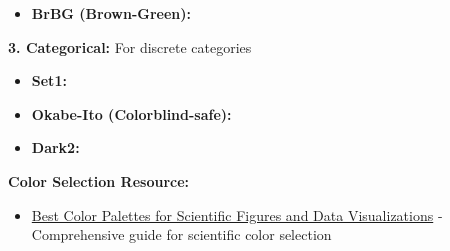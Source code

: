 \documentclass[11pt,a4paper]{article}
\begin{document}
\begin{tcolorbox}[colback=blue!5,colframe=blue!50,title=Professional Color Palettes]
\begin{itemize}
    \item \textbf{BrBG (Brown-Green):} 
    \colorbox[HTML]{543005}{\phantom{XX}}
    \colorbox[HTML]{8c510a}{\phantom{XX}}
    \colorbox[HTML]{bf812d}{\phantom{XX}}
    \colorbox[HTML]{dfc27d}{\phantom{XX}}
    \colorbox[HTML]{f6e8c3}{\phantom{XX}}
    \colorbox[HTML]{c7eae5}{\phantom{XX}}
    \colorbox[HTML]{80cdc1}{\phantom{XX}}
    \colorbox[HTML]{35978f}{\phantom{XX}}
    \colorbox[HTML]{01665e}{\phantom{XX}}
    \colorbox[HTML]{003c30}{\phantom{XX}}
\end{itemize}

\textbf{3. Categorical:} For discrete categories

\begin{itemize}
    \item \textbf{Set1:} 
    \colorbox[HTML]{e41a1c}{\phantom{XX}}
    \colorbox[HTML]{377eb8}{\phantom{XX}}
    \colorbox[HTML]{4daf4a}{\phantom{XX}}
    \colorbox[HTML]{984ea3}{\phantom{XX}}
    \colorbox[HTML]{ff7f00}{\phantom{XX}}
    \colorbox[HTML]{ffff33}{\phantom{XX}}
    \colorbox[HTML]{a65628}{\phantom{XX}}
    \colorbox[HTML]{f781bf}{\phantom{XX}}
    \colorbox[HTML]{999999}{\phantom{XX}}
    
    \item \textbf{Okabe-Ito (Colorblind-safe):} 
    \colorbox[HTML]{E69F00}{\phantom{XX}}
    \colorbox[HTML]{56B4E9}{\phantom{XX}}
    \colorbox[HTML]{009E73}{\phantom{XX}}
    \colorbox[HTML]{F0E442}{\phantom{XX}}
    \colorbox[HTML]{0072B2}{\phantom{XX}}
    \colorbox[HTML]{D55E00}{\phantom{XX}}
    \colorbox[HTML]{CC79A7}{\phantom{XX}}
    \colorbox[HTML]{000000}{\phantom{XX}}
    
    \item \textbf{Dark2:} 
    \colorbox[HTML]{1b9e77}{\phantom{XX}}
    \colorbox[HTML]{d95f02}{\phantom{XX}}
    \colorbox[HTML]{7570b3}{\phantom{XX}}
    \colorbox[HTML]{e7298a}{\phantom{XX}}
    \colorbox[HTML]{66a61e}{\phantom{XX}}
    \colorbox[HTML]{e6ab02}{\phantom{XX}}
    \colorbox[HTML]{a6761d}{\phantom{XX}}
    \colorbox[HTML]{666666}{\phantom{XX}}
\end{itemize}
\end{tcolorbox}

\textbf{Color Selection Resource:}
\begin{itemize}
    \item \href{https://www.simplifiedsciencepublishing.com/resources/best-color-palettes-for-scientific-figures-and-data-visualizations}{Best Color Palettes for Scientific Figures and Data Visualizations} - Comprehensive guide for scientific color selection
\end{itemize}
\end{document}
